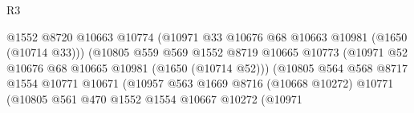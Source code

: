 \begin{lexlean}{R3}
\begin{coremodule}
                                              @1552
                                              @8720
                                              @10663
                                              @10774
                                              (@10971
                                                @33
                                                @10676
                                                @68
                                                @10663
                                                @10981
                                                (@1650 (@10714 @33)))
                                              (@10805
                                                @559
                                                @569
                                                @1552
                                                @8719
                                                @10665
                                                @10773
                                                (@10971
                                                  @52
                                                  @10676
                                                  @68
                                                  @10665
                                                  @10981
                                                  (@1650 (@10714 @52)))
                                                (@10805
                                                  @564
                                                  @568
                                                  @8717
                                                  @1554
                                                  @10771
                                                  @10671
                                                  (@10957
                                                    @563
                                                    @1669
                                                    @8716
                                                    (@10668 @10272)
                                                    @10771
                                                    (@10805
                                                      @561
                                                      @470
                                                      @1552
                                                      @1554
                                                      @10667
                                                      @10272
                                                      (@10971

\end{coremodule}
\end{lexlean}

